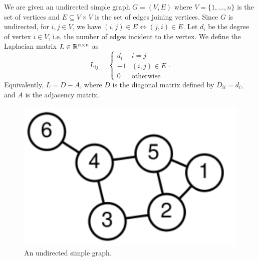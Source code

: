 
We are given an undirected simple graph $G=(V,E)$ where $V=\{1,\ldots,n\}$ is the set of vertices and $E\subseteq V\times V$ is the set of edges joining vertices. Since $G$ is undirected, for $i,j\in V$, we have $(i,j)\in E\Leftrightarrow (j,i)\in E$. Let $d_i$ be the degree of vertex $i\in V$, i.e. the number of edges incident to the vertex. We define the Laplacian matrix $L\in\mathbb{R}^{n\times n}$ as
\begin{equation*}
    L_{ij}=
    \begin{cases}
    d_i & i=j\\
    -1 & (i,j)\in E\\
    0 & \text{otherwise}
    \end{cases}.
\end{equation*}
Equivalently, $L=D-A$, where $D$ is the diagonal matrix defined by $D_{ii}=d_i$, and $A$ is the adjacency matrix.

\begin{figure}[h!]
    \centering
    \includegraphics{"figures/UndirectedGraph"}
    \caption{An undirected simple graph.}
    \label{fig:graph}
\end{figure}

